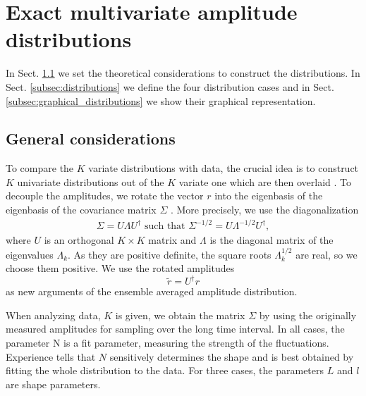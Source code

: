 \section{Exact multivariate amplitude distributions}
\label{sec:exact_distributions}


In Sect. \ref{subsec:general_considerations} we set the theoretical
considerations to construct the distributions. In Sect.
\ref{subsec:distributions} we define the four distribution cases and in Sect.
\ref{subsec:graphical_distributions} we show their graphical representation.

\subsection{General considerations}\label{subsec:general_considerations}

To compare the $K$ variate distributions with data, the crucial idea is to
construct $K$ univariate distributions out of the $K$ variate one which are
then overlaid \cite{exact_distributions_guhr}. To decouple the amplitudes, we
rotate the vector $r$ into the eigenbasis of the eigenbasis of the covariance
matrix $\Sigma$ \cite{non_stationarity_fin_guhr,exact_distributions_guhr}. More
precisely, we use the diagonalization
\begin{align}
    \Sigma = U \Lambda U^{\dagger} \text{ such that }
    \Sigma^{-1/2} = U \Lambda^{-1/2} U^{\dagger},
\end{align}
where $U$ is an orthogonal $K \times K$ matrix and $\Lambda$ is the diagonal
matrix of the eigenvalues $\Lambda_{k}$. As they are positive definite, the
square roots $\Lambda_{k}^{1/2}$ are real, so we choose them positive. We use
the rotated amplitudes
\begin{equation}
    \tilde{r} = U^{\dagger} r
\end{equation}
as new arguments of the ensemble averaged amplitude distribution.

When analyzing data, $K$ is given, we obtain the matrix $\Sigma$ by using the
originally measured amplitudes for sampling over the long time interval. In all
cases, the parameter N is a fit parameter, measuring the strength of the
fluctuations. Experience tells that $N$ sensitively determines the shape and is
best obtained by fitting the whole distribution to the data. For three cases,
the parameters $L$ and $l$ are shape parameters.

